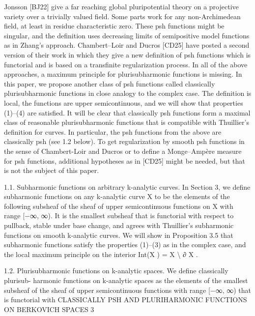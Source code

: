 \documentclass[
  10pt,
]{article}
\newenvironment{Shaded}{}{}
\newcommand{\NormalTok}[1]{#1}
\begin{document}
\begin{Shaded}
\begin{Highlighting}[]
\NormalTok{Jonsson [BJ22] give a far reaching global pluripotential theory on a projective variety}
\NormalTok{over a trivially valued field. Some parts work for any non{-}Archimedean field, at least in}
\NormalTok{residue characteristic zero. These psh functions might be singular, and the definition uses}
\NormalTok{decreasing limits of semipositive model functions as in Zhang’s approach. Chambert–Loir}
\NormalTok{and Ducros [CD25] have posted a second version of their work in which they give a new}
\NormalTok{definition of psh functions which is functorial and is based on a transfinite regularization}
\NormalTok{process.}
\NormalTok{   In all of the above approaches, a maximum principle for plurisubharmonic functions}
\NormalTok{is missing. In this paper, we propose another class of psh functions called classically}
\NormalTok{plurisubharmonic functions in close analogy to the complex case. The definition is local,}
\NormalTok{the functions are upper semicontinuous, and we will show that properties (1)–(4) are}
\NormalTok{satisfied. It will be clear that classically psh functions form a maximal class of reasonable}
\NormalTok{plurisubharmonic functions that is compatible with Thuillier’s definition for curves. In}
\NormalTok{particular, the psh functions from the above are classically psh (see 1.2 below).}
\NormalTok{   To get regularization by smooth psh functions in the sense of Chambert{-}Loir and Ducros}
\NormalTok{or to define a Monge–Ampère measure for psh functions, additional hypotheses as in}
\NormalTok{[CD25] might be needed, but that is not the subject of this paper.}

\NormalTok{1.1. Subharmonic functions on arbitrary k{-}analytic curves. In Section 3, we define}
\NormalTok{subharmonic functions on any k{-}analytic curve X to be the elements of the following}
\NormalTok{subsheaf of the sheaf of upper semicontinuous functions on X with range [−∞, ∞).}
\NormalTok{It is the smallest subsheaf that is functorial with respect to pullback, stable under base}
\NormalTok{change, and agrees with Thuillier’s subharmonic functions on smooth k{-}analytic curves.}
\NormalTok{We will show in Proposition 3.5 that subharmonic functions satisfy the properties (1)–(3)}
\NormalTok{as in the complex case, and the local maximum principle on the interior Int(X ) = X \textbackslash{} ∂ X .}

\NormalTok{1.2. Plurisubharmonic functions on k{-}analytic spaces. We define classically plurisub{-}}
\NormalTok{harmonic functions on k{-}analytic spaces as the elements of the smallest subsheaf of the}
\NormalTok{sheaf of upper semicontinuous functions with range [−∞, ∞) that is functorial with}
\NormalTok{             CLASSICALLY PSH AND PLURIHARMONIC FUNCTIONS ON BERKOVICH SPACES              3}


\end{Highlighting}
\end{Shaded}
\end{document}
